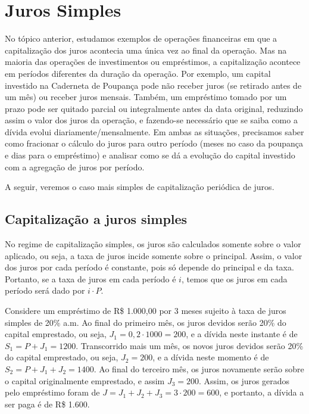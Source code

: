 
\newpage
\setcounter{section}{1}
\section{Juros Simples}

No tópico anterior, estudamos exemplos de operações financeiras em que a capitalização dos juros acontecia uma única vez ao final da operação. Mas na maioria das operações de investimentos ou empréstimos, a capitalização acontece em períodos diferentes da duração da operação. Por exemplo, um capital investido na Caderneta de Poupança pode não receber juros (se retirado antes de um mês) ou receber juros mensais. Também, um empréstimo tomado por um prazo pode ser quitado parcial ou integralmente antes da data original, reduzindo assim o valor dos juros da operação, e fazendo-se necessário que se saiba como a dívida evolui diariamente/mensalmente. Em ambas as situações, precisamos saber como fracionar o cálculo do juros para outro período (meses no caso da poupança e dias para o empréstimo) e analisar como se dá a evolução do capital investido com a agregação de juros por período. 

A seguir, veremos o caso mais simples de capitalização periódica de juros.


\subsection{Capitalização a juros simples}

No regime de capitalização simples, os juros são calculados somente sobre o valor aplicado, ou seja, a taxa de juros incide somente sobre o principal. Assim, o valor dos juros por cada período é constante, pois só depende do principal e da taxa. Portanto, se a taxa de juros em cada período é $i$, temos que os juros em cada período será dado por $i\cdot P$.

Considere um empréstimo de R\$ 1.000,00 por 3 meses sujeito à taxa de juros simples de 20\% a.m. Ao final do primeiro mês, os juros devidos serão 20\% do capital emprestado, ou seja, $J_1 = 0,2 \cdot 1000 = 200$, e a dívida neste instante é de $S_1= P+J_1 = 1200$. Transcorrido mais um mês, os novos juros devidos serão 20\% do capital emprestado, ou seja, $J_2 = 200$, e a dívida neste momento é de $S_2=P+J_1+J_2=1400$. Ao final do terceiro mês, os juros novamente serão sobre o capital originalmente emprestado, e assim $J_3 = 200$. Assim, os juros gerados pelo empréstimo foram de $J=J_1+J_2+J_3=3\cdot 200=600$, e portanto, a dívida a ser paga é de R\$ 1.600. 

